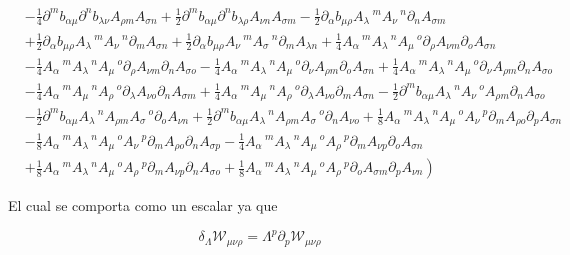 \documentclass{article}
\numberwithin{equation}{section}
\begin{document}
\begin{equation}
\begin{aligned}
&- \frac{1}{4}\partial^{m}b_{\alpha \mu} \partial^{n}b_{\lambda \nu} A_{\rho m} A_{\sigma n}+\frac{1}{2}\partial^{m}b_{\alpha \mu} \partial^{n}b_{\lambda \rho} A_{\nu n} A_{\sigma m} - \frac{1}{2}\partial_{\alpha}b_{\mu \rho} A_{\lambda}\,^{m} A_{\nu}\,^{n} \partial_{n}A_{\sigma m}\\
&+\frac{1}{2}\partial_{\alpha}b_{\mu \rho} A_{\lambda}\,^{m} A_{\nu}\,^{n} \partial_{m}A_{\sigma n}+\frac{1}{2}\partial_{\alpha}b_{\mu \rho} A_{\nu}\,^{m} A_{\sigma}\,^{n} \partial_{m}A_{\lambda n} +\frac{1}{4}A_{\alpha}\,^{m} A_{\lambda}\,^{n} A_{\mu}\,^{o} \partial_{\rho}A_{\nu m} \partial_{o}A_{\sigma n}\\
&- \frac{1}{4}A_{\alpha}\,^{m} A_{\lambda}\,^{n} A_{\mu}\,^{o} \partial_{\rho}A_{\nu m} \partial_{n}A_{\sigma o} - \frac{1}{4}A_{\alpha}\,^{m} A_{\lambda}\,^{n} A_{\mu}\,^{o} \partial_{\nu}A_{\rho m} \partial_{o}A_{\sigma n}+\frac{1}{4}A_{\alpha}\,^{m} A_{\lambda}\,^{n} A_{\mu}\,^{o} \partial_{\nu}A_{\rho m} \partial_{n}A_{\sigma o}\\
&- \frac{1}{4}A_{\alpha}\,^{m} A_{\mu}\,^{n} A_{\rho}\,^{o} \partial_{\lambda}A_{\nu o} \partial_{n}A_{\sigma m}+\frac{1}{4}A_{\alpha}\,^{m} A_{\mu}\,^{n} A_{\rho}\,^{o} \partial_{\lambda}A_{\nu o} \partial_{m}A_{\sigma n} - \frac{1}{2}\partial^{m}b_{\alpha \mu} A_{\lambda}\,^{n} A_{\nu}\,^{o} A_{\rho m} \partial_{n}A_{\sigma o}\\
&- \frac{1}{2}\partial^{m}b_{\alpha \mu} A_{\lambda}\,^{n} A_{\rho m} A_{\sigma}\,^{o} \partial_{o}A_{\nu n}+\frac{1}{2}\partial^{m}b_{\alpha \mu} A_{\lambda}\,^{n} A_{\rho m} A_{\sigma}\,^{o} \partial_{n}A_{\nu o}+\frac{1}{8}A_{\alpha}\,^{m} A_{\lambda}\,^{n} A_{\mu}\,^{o} A_{\nu}\,^{p} \partial_{m}A_{\rho o} \partial_{p}A_{\sigma n}\\
&- \frac{1}{8}A_{\alpha}\,^{m} A_{\lambda}\,^{n} A_{\mu}\,^{o} A_{\nu}\,^{p} \partial_{m}A_{\rho o} \partial_{n}A_{\sigma p} - \frac{1}{4}A_{\alpha}\,^{m} A_{\lambda}\,^{n} A_{\mu}\,^{o} A_{\rho}\,^{p} \partial_{m}A_{\nu p} \partial_{o}A_{\sigma n}\\
& \left.+\frac{1}{8}A_{\alpha}\,^{m} A_{\lambda}\,^{n} A_{\mu}\,^{o} A_{\rho}\,^{p} \partial_{m}A_{\nu p} \partial_{n}A_{\sigma o} +\frac{1}{8}A_{\alpha}\,^{m} A_{\lambda}\,^{n} A_{\mu}\,^{o} A_{\rho}\,^{p} \partial_{o}A_{\sigma m} \partial_{p} A_{\nu n} \right)
\end{aligned}
\end{equation}

El cual se comporta como un escalar ya que

\begin{equation}
\delta_{\Lambda} \mathcal{W}_{\mu \nu \rho}  = \Lambda^p \partial_p \mathcal{W}_{\mu \nu \rho} 
\end{equation}
\end{document}
